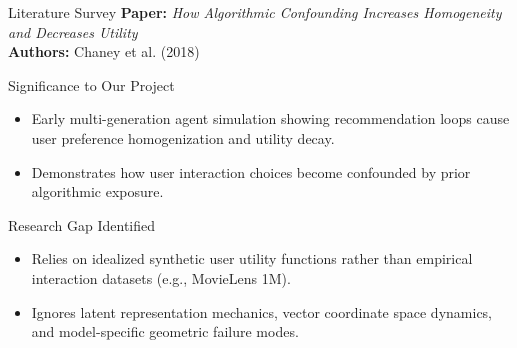 \documentclass[11pt,aspectratio=43,xcolor=table]{beamer}
\begin{document}
\begin{frame}{Literature Survey}
\small
\textbf{Paper:} \emph{How Algorithmic Confounding Increases Homogeneity and Decreases Utility} \\
\textbf{Authors:} Chaney et al. (2018)

\vspace{0.15cm}
\begin{block}{Significance to Our Project}
\begin{itemize}
  \item Early multi-generation agent simulation showing recommendation loops cause user preference homogenization and utility decay.
  \item Demonstrates how user interaction choices become confounded by prior algorithmic exposure.
\end{itemize}
\end{block}

\vspace{0.05cm}
\begin{block}{Research Gap Identified}
\begin{itemize}
  \item Relies on idealized synthetic user utility functions rather than empirical interaction datasets (e.g., MovieLens 1M).
  \item Ignores latent representation mechanics, vector coordinate space dynamics, and model-specific geometric failure modes.
\end{itemize}
\end{block}
\end{frame}
\end{document}
